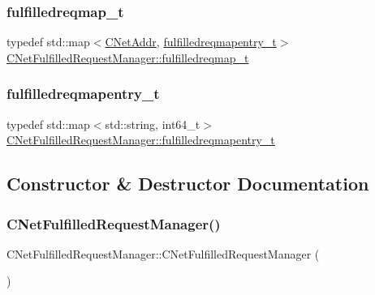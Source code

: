\subsubsection{\texorpdfstring{fulfilledreqmap\+\_\+t}{fulfilledreqmap\_t}}
{\footnotesize\ttfamily typedef std\+::map$<$\mbox{\hyperlink{class_c_net_addr}{C\+Net\+Addr}}, \mbox{\hyperlink{class_c_net_fulfilled_request_manager_abd91edcf71a75eb9459f0e5997d39570}{fulfilledreqmapentry\+\_\+t}}$>$ \mbox{\hyperlink{class_c_net_fulfilled_request_manager_a08e49de0fb5f459a2238c98720b1b420}{C\+Net\+Fulfilled\+Request\+Manager\+::fulfilledreqmap\+\_\+t}}\hspace{0.3cm}{\ttfamily [private]}}

\mbox{\label{class_c_net_fulfilled_request_manager_abd91edcf71a75eb9459f0e5997d39570}} 
\subsubsection{\texorpdfstring{fulfilledreqmapentry\+\_\+t}{fulfilledreqmapentry\_t}}
{\footnotesize\ttfamily typedef std\+::map$<$std\+::string, int64\+\_\+t$>$ \mbox{\hyperlink{class_c_net_fulfilled_request_manager_abd91edcf71a75eb9459f0e5997d39570}{C\+Net\+Fulfilled\+Request\+Manager\+::fulfilledreqmapentry\+\_\+t}}\hspace{0.3cm}{\ttfamily [private]}}



\subsection{Constructor \& Destructor Documentation}
\mbox{\label{class_c_net_fulfilled_request_manager_a74df64fc0168917f6b4189180174494d}} 
\subsubsection{\texorpdfstring{C\+Net\+Fulfilled\+Request\+Manager()}{CNetFulfilledRequestManager()}}
{\footnotesize\ttfamily C\+Net\+Fulfilled\+Request\+Manager\+::\+C\+Net\+Fulfilled\+Request\+Manager (\begin{DoxyParamCaption}{ }\end{DoxyParamCaption})\hspace{0.3cm}{\ttfamily [inline]}}



